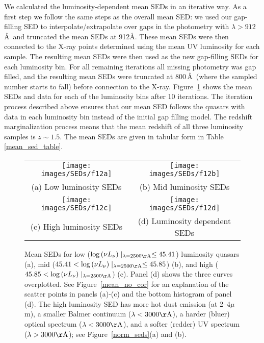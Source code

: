 We calculated the luminosity-dependent mean SEDs in an iterative way.  As a first step we follow the same steps as the overall mean SED: we used our gap-filling SED to interpolate/extrapolate over gaps in the photometry with $\lambda>912$\,\AA\ and truncated the mean SEDs at 912\AA.  These mean SEDs were then connected to the X-ray points determined using the mean UV luminosity for each sample.  The resulting mean SEDs were then used as the new gap-filling SEDs for each luminosity bin.  For all remaining iterations all missing photometry was gap filled, and the resulting mean SEDs were truncated at 800\,\AA\ (where the sampled number starts to fall) before connection to the X-ray. Figure~\ref{lum_bin} shows the mean SEDs and data for each of the luminosity bins after 10 iterations.  
The iteration process described above ensures that our mean SED follows the quasars with data in each luminosity bin instead of the initial gap filling model.  The redshift marginalization process means that the mean redshift of all three luminosity samples is $z \sim 1.5$.  The mean SEDs are given in tabular form in Table \ref{mean_sed_table}.

\begin{figure}
 \centering
 
\begin{tabular}{cc}
\texttt{[image: images/SEDs/f12a]} & \texttt{[image: images/SEDs/f12b]} \\
 (a) Low luminosity SEDs & (b) Mid luminosity SEDs \\
\texttt{[image: images/SEDs/f12c]} & \texttt{[image: images/SEDs/f12d]} \\
 (c) High luminosity SEDs & (d) Luminosity dependent SEDs
 \end{tabular}

 \caption[Luminosity dependent SEDs]{Mean SEDs for low ($\log{(\nu L_{\nu})}\mid_{\lambda=2500 {\rm \AA}} \leq 45.41$) luminosity quasars (a), mid ($45.41< \log{(\nu L_{\nu})}\mid_{\lambda=2500 {\rm \AA}} \leq 45.85$) (b), and high ($45.85 < \log{(\nu L_{\nu})}\mid_{\lambda=2500 {\rm \AA}}$) (c). Panel (d) shows the three curves overplotted.
 See Figure~\ref{mean_no_cor} for an explanation of the scatter points in panels (a)-(c) and the bottom histogram of panel (d). 
 The high luminosity SED has more hot dust emission (at 2--4$\mu$m), a smaller Balmer continuum ($\lambda<3000{\rm \AA}$), a harder (bluer) optical spectrum ($\lambda<3000{\rm \AA}$), and a softer (redder) UV spectrum ($\lambda>3000{\rm \AA}$); see Figure~\ref{norm_seds}(a) and (b).}
 \label{lum_bin}
\end{figure}

